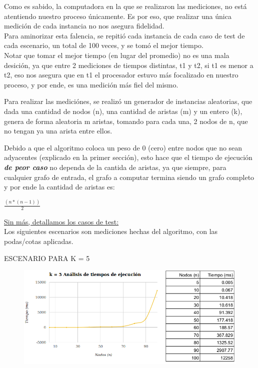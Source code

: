 Como es sabido, la computadora en la que se realizaron las mediciones, no está atentiendo nuestro proceso únicamente. Es por eso, que realizar una única medición de cada instancia no nos asegura fidelidad.\\
\indent Para aminorizar esta falencia, se repitió cada instancia de cada caso de test de cada escenario, un total de 100 veces, y se tomó el mejor tiempo.\\
Notar que tomar el mejor tiempo (en lugar del promedio) no es una mala desición, ya que entre 2 mediciones de tiempos distintas, t1 y t2, si t1 es menor a t2, eso nos asegura que en t1 el procesador estuvo más focalizado en nuestro proceso, y por ende, es una medición más fiel del mismo.

Para realizar las mediciónes, se realizó un generador de instancias aleatorias, que dada una cantidad de nodos (n), una cantidad de aristas (m) y un entero (k), genera de forma aleatoria m aristas, tomando para cada una, 2 nodos de n, que no tengan ya una arista entre ellos.

Debido a que el algoritmo coloca un peso de 0 (cero) entre nodos que no sean adyacentes (explicado en la primer sección), esto hace que el tiempo de ejecución \textit{\textbf{de peor caso}} no dependa de la cantida de aristas, ya que siempre, para cualquier grafo de entrada, el grafo a computar termina siendo un grafo completo y por ende la cantidad de aristas es:

\begin{center}
\LARGE $\frac{(n * (n-1))}{2}$ \\
\end{center}


\underline{Sin más, detallamos los casos de test:}\\

Los siguientes escenarios son mediciones hechas del algoritmo, con las podas/cotas aplicadas.

\indent ESCENARIO PARA K = 5
	\begin{figure}[h]
		\begin{center}
		   \includegraphics[scale=0.70]{ejercicio2/k5.png}
		\end{center}
	\end{figure}

